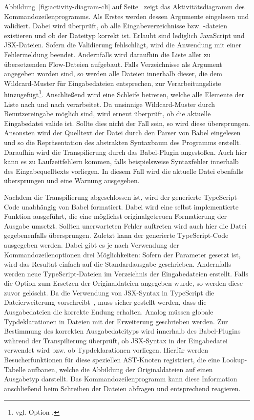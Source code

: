 Abbildung~\ref{fig:activity-diagram-cli} auf Seite~\pageref{fig:activity-diagram-cli} zeigt das Aktivitätsdiagramm des Kommandozeilenprogramms. Als Erstes werden dessen Argumente eingelesen und validiert. Dabei wird überprüft, ob alle Eingabeverzeichnisse bzw. -dateien existieren und ob der Dateityp korrekt ist. Erlaubt sind lediglich JavaScript und JSX-Dateien. Sofern die Validierung fehlschlägt, wird die Anwendung mit einer Fehlermeldung beendet. Andernfalls wird daraufhin die Liste aller zu übersetzenden Flow-Dateien aufgebaut. Falls Verzeichnisse als Argument angegeben worden sind, so werden alle Dateien innerhalb dieser, die dem Wildcard-Muster für Eingabedateien entsprechen, zur Verarbeitungsliste hinzugefügt\footnote{vgl. Option .}. Anschließend wird eine Schleife betreten, welche alle Elemente der Liste nach und nach verarbeitet. Da unsinnige Wildcard-Muster durch Benutzereingabe möglich sind, wird erneut überprüft, ob die aktuelle Eingabedatei valide ist. Sollte dies nicht der Fall sein, so wird diese übersprungen. Ansonsten wird der Quelltext der Datei durch den Parser von Babel eingelesen und so die Repräsentation des abstrakten Syntaxbaum des Programms erstellt. Daraufhin wird die Transpilierung durch das Babel-Plugin angestoßen. Auch hier kann es zu Laufzeitfehlern kommen, falls beispielsweise Syntaxfehler innerhalb des Eingabequelltexts vorliegen. In diesem Fall wird die aktuelle Datei ebenfalls übersprungen und eine Warnung ausgegeben.

Nachdem die Transpilierung abgeschlossen ist, wird der generierte TypeScript-Code unabhängig von Babel formatiert. Dabei wird eine selbst implementierte Funktion ausgeführt, die eine möglichst originalgetreuen Formatierung der Ausgabe umsetzt. Sollten unerwarteten Fehler auftreten wird auch hier die Datei gegebenenfalls übersprungen. Zuletzt kann der generierte TypeScript-Code ausgegeben werden. Dabei gibt es je nach Verwendung der Kommandozeilenoptionen drei Möglichkeiten: Sofern der Parameter  gesetzt ist, wird das Resultat einfach auf die Standardausgabe geschrieben. Andernfalls werden neue TypeScript-Dateien im Verzeichnis der Eingabedateien erstellt. Falls die Option zum Ersetzen der Originaldateien angegeben wurde, so werden diese zuvor gelöscht.
Da die Verwendung von JSX-Syntax in TypeScript die Dateierweiterung  vorschreibt~\autocite{TYPESCRIPT_HANDBOOK:JSX}, muss sicher gestellt werden, dass die Ausgabedateien die korrekte Endung erhalten. Analog müssen globale Typdeklarationen in Dateien mit der Erweiterung  geschrieben werden. Zur Bestimmung des korrekten Ausgabedateityps wird innerhalb des Babel-Plugins während der Transpilierung überprüft, ob JSX-Syntax in der Eingabedatei verwendet wird bzw. ob Typdeklarationen vorliegen. Hierfür werden Besucherfunktionen für diese speziellen AST-Knoten registriert, die eine Lookup-Tabelle aufbauen, welche die Abbildung der Originaldateien auf einen Ausgabetyp darstellt. Das Kommandozeilenprogramm kann diese Information anschließend beim Schreiben der Dateien abfragen und entsprechend reagieren.

